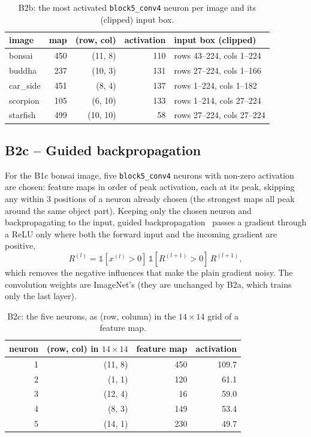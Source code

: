 \documentclass[11pt,a4paper]{article}
\newcommand{\code}[1]{\texttt{#1}}
\begin{document}
\begin{table}[H]\centering\small\begin{tabular}{@{}lrrrl@{}}\toprule image & map & (row, col) & activation & input box (clipped) \\ \midrule
bonsai & 450 & (11, 8) & 110 & rows 43--224, cols 1--224 \\
buddha & 237 & (10, 3) & 131 & rows 27--224, cols 1--166 \\
car\_side & 451 & (8, 4) & 137 & rows 1--224, cols 1--182 \\
scorpion & 105 & (6, 10) & 133 & rows 1--214, cols 27--224 \\
starfish & 499 & (10, 10) & 58 & rows 27--224, cols 27--224 \\
\bottomrule\end{tabular}
\caption{B2b: the most activated \code{block5\_conv4} neuron per image and its (clipped) input box.}\label{tab:b2b}
\end{table}

\subsection{B2c -- Guided backpropagation}
For the B1c bonsai image, five \code{block5\_conv4} neurons with non-zero activation are chosen:
feature maps in order of peak activation, each at its peak, skipping any within 3 positions of a
neuron already chosen (the strongest maps all peak around the same object part).  Keeping only the
chosen neuron and backpropagating to the input, guided backpropagation~\cite{springenberg} passes a gradient through a
ReLU only where both the forward input and the incoming gradient are positive,
\begin{equation}\label{eq:guided}
R^{(l)} = \mathbb 1\!\left[x^{(l)} > 0\right]\,\mathbb 1\!\left[R^{(l+1)} > 0\right]\,R^{(l+1)} ,
\end{equation}
which removes the negative influences that make the plain gradient noisy.  The convolution weights
are ImageNet's (they are unchanged by B2a, which trains only the last layer).

\begin{table}[H]\centering\small\begin{tabular}{@{}rrrr@{}}\toprule neuron & (row, col) in $14\times14$ & feature map & activation \\ \midrule
1 & (11, 8) & 450 & 109.7 \\
2 & (1, 1) & 120 & 61.1 \\
3 & (12, 4) & 16 & 59.0 \\
4 & (8, 3) & 149 & 53.4 \\
5 & (14, 1) & 230 & 49.7 \\
\bottomrule\end{tabular}
\caption{B2c: the five neurons, as (row, column) in the $14\times14$ grid of a feature map.}\label{tab:b2c}
\end{table}
\end{document}
